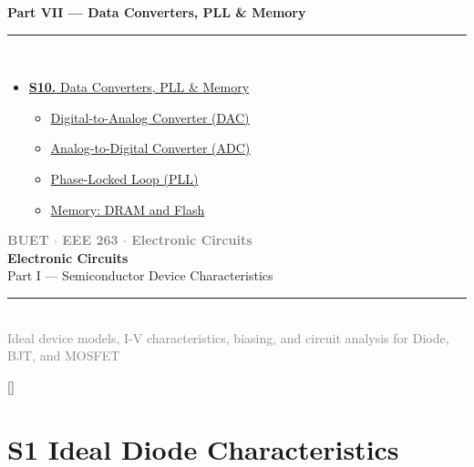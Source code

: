 \documentclass[12pt,a4paper]{article}
\newcommand{\secdivider}[3]{%
  \newpage\thispagestyle{empty}%
  \vspace*{\fill}%
  \begin{tcolorbox}[enhanced,colback=#3!6,colframe=#3,boxrule=1.5pt,arc=8pt,
    left=20pt,right=20pt,top=22pt,bottom=22pt,
    shadow={3pt}{-3pt}{0pt}{black!15}]
    \centering
    {\large\textcolor{gray}{\textbf{BUET $\cdot$ EEE 263 $\cdot$ Electronic Circuits}}}\\[8pt]
    {\fontsize{26}{32}\selectfont\bfseries\textcolor{#3}{Electronic Circuits}}\\[6pt]
    {\fontsize{15}{19}\selectfont\textcolor{dgray}{#1}}\\[12pt]
    \textcolor{#3!60}{\rule{0.5\textwidth}{0.5pt}}\\[6pt]
    {\small\textcolor{gray}{#2}}
  \end{tcolorbox}%
  \vspace*{\fill}\newpage%
}
\begin{document}
\begin{tcolorbox}[breakable,colback=cH!5,colframe=cH,boxrule=1pt,arc=5pt,
  left=8pt,right=8pt,top=8pt,bottom=8pt,before skip=4pt]
  {\large\bfseries\textcolor{cH}{Part VII --- Data Converters, PLL \& Memory}}\\[5pt]
  \textcolor{cH!40}{\rule{\textwidth}{0.4pt}}\\[3pt]
  \small\begin{itemize}[leftmargin=1.2em,itemsep=1pt,label={\textcolor{cH}{$\triangleright$}}]
    \item \hyperref[sec:S10]{\textbf{S10.} Data Converters, PLL \& Memory}
      \begin{itemize}[leftmargin=1.5em,itemsep=0pt,label={\textcolor{cH}{$\cdot$}}]
        \item \hyperref[sub:s10-dac]{Digital-to-Analog Converter (DAC)}
        \item \hyperref[sub:s10-adc]{Analog-to-Digital Converter (ADC)}
        \item \hyperref[sub:s10-pll]{Phase-Locked Loop (PLL)}
        \item \hyperref[sub:s10-memory]{Memory: DRAM and Flash}
      \end{itemize}
  \end{itemize}
\end{tcolorbox}

\newpage


\secdivider{Part I --- Semiconductor Device Characteristics}{Ideal device models, I-V characteristics, biasing, and circuit analysis for Diode, BJT, and MOSFET}{cA}

\label{sec:S1}
\titleformat{\section}{\large\bfseries\color{cA}}{}{0em}{}[\titlerule]
\section*{S1 \quad Ideal Diode Characteristics}
\end{document}
